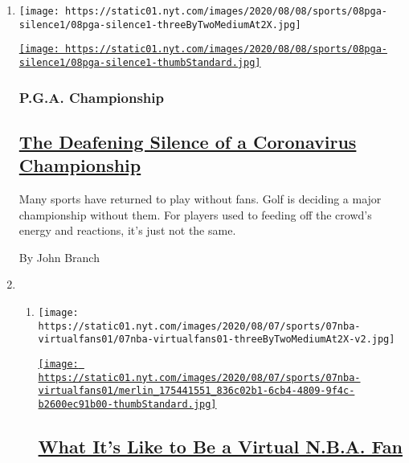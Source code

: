 \begin{enumerate}
\def\labelenumi{\arabic{enumi}.}
\item
  \texttt{[image: https://static01.nyt.com/images/2020/08/08/sports/08pga-silence1/08pga-silence1-threeByTwoMediumAt2X.jpg]}

  \href{/2020/08/08/sports/golf/pga-championship-scores.html}{\texttt{[image: https://static01.nyt.com/images/2020/08/08/sports/08pga-silence1/08pga-silence1-thumbStandard.jpg]}}

  \hypertarget{pga-championship}{%
  \subsubsection{P.G.A. Championship}\label{pga-championship}}

  \hypertarget{the-deafening-silence-of-a-coronavirus-championship}{%
  \subsection{\texorpdfstring{\href{/2020/08/08/sports/golf/pga-championship-scores.html}{The
  Deafening Silence of a Coronavirus
  Championship}}{The Deafening Silence of a Coronavirus Championship}}\label{the-deafening-silence-of-a-coronavirus-championship}}

  Many sports have returned to play without fans. Golf is deciding a
  major championship without them. For players used to feeding off the
  crowd's energy and reactions, it's just not the same.

  By John Branch
\item
  \begin{enumerate}
  \def\labelenumii{\arabic{enumii}.}
  \item
    \texttt{[image: https://static01.nyt.com/images/2020/08/07/sports/07nba-virtualfans01/07nba-virtualfans01-threeByTwoMediumAt2X-v2.jpg]}

    \href{/2020/08/07/sports/basketball/nba-virtual-fans.html}{\texttt{[image: https://static01.nyt.com/images/2020/08/07/sports/07nba-virtualfans01/merlin\_175441551\_836c02b1-6cb4-4809-9f4c-b2600ec91b00-thumbStandard.jpg]}}

    \hypertarget{what-its-like-to-be-a-virtual-nba-fan}{%
    \subsection{\texorpdfstring{\href{/2020/08/07/sports/basketball/nba-virtual-fans.html}{What
    It's Like to Be a Virtual N.B.A.
    Fan}}{What It's Like to Be a Virtual N.B.A. Fan}}\label{what-its-like-to-be-a-virtual-nba-fan}}


\end{enumerate}
\end{enumerate}
